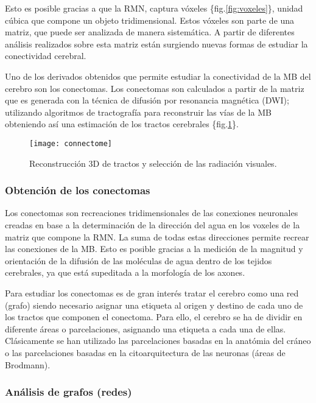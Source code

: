 \documentclass[fleqn,12pt]{UICArticle} %
\begin{document}
Esto es posible gracias a que la RMN, captura vóxeles \{fig.\ref{fig:voxeles}\}, unidad cúbica que compone un objeto tridimensional. Estos vóxeles son parte de una matriz, que puede ser analizada de manera sistemática. A partir de diferentes análisis realizados sobre esta matriz están surgiendo nuevas formas de estudiar la conectividad cerebral.

 Uno de los derivados obtenidos que permite estudiar la conectividad de la MB del cerebro son los conectomas. Los conectomas son calculados a partir de la matriz que es generada con la técnica de difusión por resonancia magnética (DWI); utilizando algoritmos de tractografía para reconstruir las vías de la MB obteniendo así una estimación de los tractos cerebrales \{fig.\ref{fig:connectome}\}.

\begin{figure}[h]
	\centering
	\texttt{[image: connectome]}
	\caption{Reconstrucción 3D de tractos y selección de las radiación visuales.}
	\label{fig:connectome}
\end{figure}

\subsubsection{Obtención de los conectomas}
Los conectomas son recreaciones tridimensionales de las conexiones neuronales creadas en base a la determinación de la dirección del agua en los voxeles de la matriz que compone la RMN. La suma de todas estas direcciones permite recrear las conexiones de la MB. Esto es posible gracias a la medición de la magnitud y orientación de la difusión de las moléculas de agua dentro de los tejidos cerebrales, ya que está supeditada a la morfología de los axones.

Para estudiar los conectomas es de gran interés tratar el cerebro como una red (grafo) \cite{Fornito} siendo necesario asignar una etiqueta al origen y destino de cada uno de los tractos que componen el conectoma. Para ello, el cerebro se ha de dividir en diferente áreas o parcelaciones, asignando una etiqueta a cada una de ellas. Clásicamente se han utilizado las parcelaciones basadas en la anatómia del cráneo o las parcelaciones basadas en la citoarquitectura de las neuronas (áreas de Brodmann).



\subsubsection{Análisis de grafos (redes)}
\end{document}
